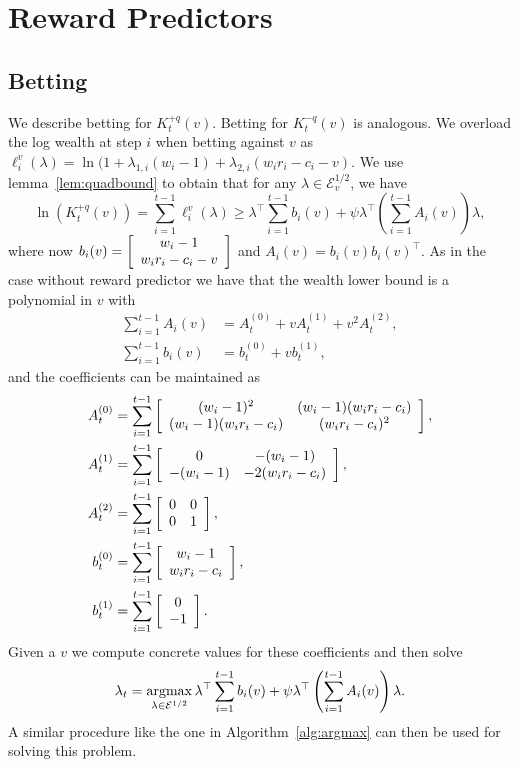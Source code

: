 \section{Reward Predictors}
\label{app:reward-predictors}
\subsection{Betting}
We describe betting for $K_t^{+q}(v)$. Betting for $K_t^{-q}(v)$ 
is analogous. 
We overload the log wealth at step $i$ when betting against $v$ as 
$\ell_i^v(\lambda) = \ln(1+ \lambda_{1,i}(w_i-1) + \lambda_{2,i}(w_i r_i -c_i -v)$. We use lemma~\ref{lem:quadbound} to obtain that for any $\lambda \in \mathcal{E}_v^{1/2}$, we have
\[
\ln(K_t^{+q}(v)) = \sum_{i=1}^{t-1} \ell_i^v(\lambda) \geq \lambda^\top \sum_{i=1}^{t-1} b_i(v) + \psi \lambda^\top \left(\sum_{i=1}^{t-1} A_i(v) \right)\lambda, 
\]
where now $b_i(v)=\left[\begin{array}{c} w_i-1 \\ w_ir_i -c_i -v \end{array}\right]$ and 
$A_i(v) = b_i(v)b_i(v)^\top$. As in the case without 
reward predictor we have that the wealth lower bound 
is a polynomial in $v$ with
    \begin{align*}
        \sum_{i=1}^{t-1} A_i(v) &= 
        A_t^{(0)} + v A_t^{(1)} + v^2 A_t^{(2)},\\   
        \sum_{i=1}^{t-1} b_i(v) &= b_t^{(0)} + v b_t^{(1)}, 
    \end{align*}
and the coefficients can be maintained as
\allowdisplaybreaks
    \begin{align*}
        A_t^{(0)} &=\sum_{i=1}^{t-1}\left[\begin{array}{cc} (w_i-1)^2 & (w_i-1)(w_i r_i-c_i) \\ (w_i-1)(w_i r_i-c_i) & (w_ir_i-c_i)^2 \end{array}\right], \\
        A_t^{(1)} &= \sum_{i=1}^{t-1} \left[\begin{array}{cc} 0 & -(w_i-1) \\ -(w_i-1) & -2(w_ir_i-c_i) \end{array}\right],\\
        A_t^{(2)} &=\sum_{i=1}^{t-1}  \left[\begin{array}{cc} 0 & 0 \\ 0 & 1 \end{array}\right],\\
        b_t^{(0)} &=\sum_{i=1}^{t-1}  \left[\begin{array}{c} w_i-1 \\ w_ir_i-c_i \end{array}\right],\\
        b_t^{(1)} &=\sum_{i=1}^{t-1}  \left[\begin{array}{c} 0 \\ -1 \end{array}\right].
    \end{align*}
Given a $v$ we compute concrete values for these coefficients 
and then solve 
\[
\lambda_t = \operatorname*{argmax}_{\lambda \in \mathcal{E}^{1/2}} 
\lambda^\top \sum_{i=1}^{t-1} b_i(v) + \psi \lambda^\top \left(\sum_{i=1}^{t-1} A_i(v) \right)\lambda.
\]
A similar procedure like the one in Algorithm~\ref{alg:argmax} 
can then be used for solving this problem.

